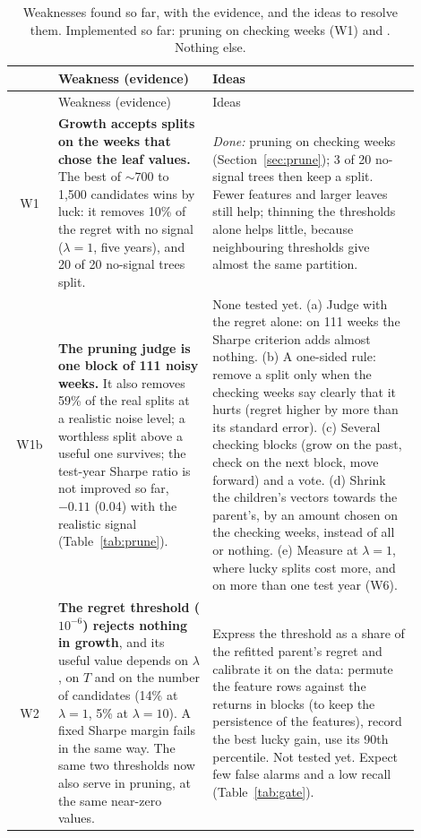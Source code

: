 \documentclass[11pt,a4paper]{article}
\newcommand{\1}{\mathbf{1}}
\newcommand{\code}[1]{\texttt{\detokenize{#1}}}
\begin{document}
\begingroup\small
\begin{longtable}{@{}c >{\raggedright\arraybackslash}p{0.385\linewidth} >{\raggedright\arraybackslash}p{0.515\linewidth}@{}}
\caption{Weaknesses found so far, with the evidence, and the ideas to resolve them. Implemented so far: pruning on checking weeks (W1) and \code{max_thresholds}. Nothing else.}\label{tab:weak}\\
\toprule
& Weakness (evidence) & Ideas\\
\midrule
\endfirsthead
\toprule
& Weakness (evidence) & Ideas\\
\midrule
\endhead
\bottomrule
\endfoot
W1 & \textbf{Growth accepts splits on the weeks that chose the leaf values.} The best of ${\sim}700$ to 1,500 candidates wins by luck: it removes 10\% of the regret with no signal ($\lambda=1$, five years), and 20 of 20 no-signal trees split. & \emph{Done:} pruning on checking weeks (Section~\ref{sec:prune}); 3 of 20 no-signal trees then keep a split. Fewer features and larger leaves still help; thinning the thresholds alone helps little, because neighbouring thresholds give almost the same partition.\\
\addlinespace
W1b & \textbf{The pruning judge is one block of 111 noisy weeks.} It also removes 59\% of the real splits at a realistic noise level; a worthless split above a useful one survives; the test-year Sharpe ratio is not improved so far, $-0.11$ (0.04) with the realistic signal (Table~\ref{tab:prune}). & None tested yet. (a) Judge with the regret alone: on 111 weeks the Sharpe criterion adds almost nothing. (b) A one-sided rule: remove a split only when the checking weeks say clearly that it hurts (regret higher by more than its standard error). (c) Several checking blocks (grow on the past, check on the next block, move forward) and a vote. (d) Shrink the children's vectors towards the parent's, by an amount chosen on the checking weeks, instead of all or nothing. (e) Measure at $\lambda=1$, where lucky splits cost more, and on more than one test year (W6).\\
\addlinespace
W2 & \textbf{The regret threshold ($10^{-6}$) rejects nothing in growth}, and its useful value depends on $\lambda$, on $T$ and on the number of candidates (14\% at $\lambda=1$, 5\% at $\lambda=10$). A fixed Sharpe margin fails in the same way. The same two thresholds now also serve in pruning, at the same near-zero values. & Express the threshold as a share of the refitted parent's regret and calibrate it on the data: permute the feature rows against the returns in blocks (to keep the persistence of the features), record the best lucky gain, use its 90th percentile. Not tested yet. Expect few false alarms and a low recall (Table~\ref{tab:gate}).\\

\end{longtable}
\end{document}
